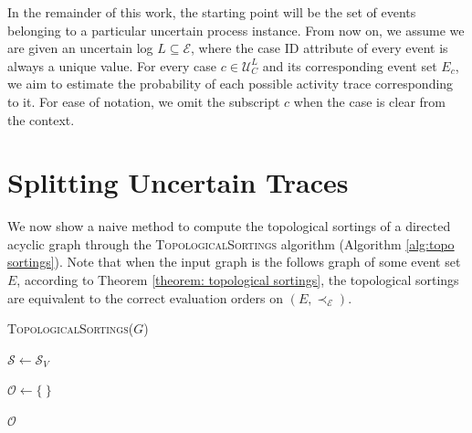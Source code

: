 In the remainder of this work, the starting point will be the set of events belonging to a particular uncertain process instance.
From now on, we assume we are given an uncertain log $L \subseteq \mathcal{E}$, where the case ID attribute of every event is always a unique value.
For every case $c \in \mathcal{U}_C^L$ and its corresponding event set $E_c$, we aim to estimate the probability of each possible activity trace corresponding to it.
For ease of notation, we omit the subscript $c$ when the case is clear from the context.

\section{Splitting Uncertain Traces}
We now show a naive method to compute the topological sortings of a directed acyclic graph through the \textsc{TopologicalSortings} algorithm (Algorithm \ref{alg:topo sortings}). 
Note that when the input graph is the follows graph of some event set $E$, according to Theorem \ref{theorem: topological sortings}, the topological sortings are equivalent to the correct evaluation orders on $(E,\prec_{\mathcal{E}})$.

\begin{algorithm}[h!]
	\caption{\textsc{TopologicalSortings($G$)}}
	\label{alg:topo sortings}
	
	$\mathcal{S} \gets \mathcal{S}_V$  \label{2: 1}
	
		
	$\mathcal{O} \gets \{ ~ \}$	
	
	\Return $\mathcal{O}$
	

\end{algorithm}

